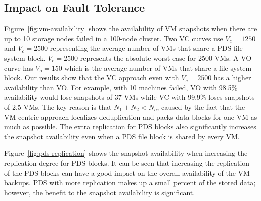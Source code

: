 \subsection{Impact on Fault Tolerance}
Figure~\ref{fig:vm-availability} shows the availability of VM snapshots when 
there are up to 10 storage nodes failed in a 100-node cluster. 
Two VC curves use $V_c=1250$ and $V_c=2500$ representing the average number of VMs that share a PDS file system block. 
$V_c=2500$ represents  the absolute worst case for 2500 VMs. 
A  VO curve has  $V_o=150$ which is  the average number of VMs that share a file system block. 
Our results show that the VC approach even with $V_c=2500$ has a higher availability than VO.
For example, with 10 machines failed, VO with 98.5\% availability would lose snapshots of 37 VMs 
while VC with 99.9\% loses snapshots of 2.5 VMs.
The key reason is that  $N_1 +N_2 < N_o$, caused by the fact that the VM-centric approach localizes deduplication
and packs  data blocks for one VM as much as possible.  The extra replication
for PDS blocks also significantly increases the snapshot availability even when
a PDS file block is shared by every VM.

Figure~\ref{fig:pds-replication}
shows the snapshot availability when increasing the replication degree for PDS blocks. 
It can be seen that increasing the replication of 
the PDS blocks can have a good impact on the overall availability of the VM backups. 
PDS with more replication  makes up a small percent of the
stored data; however, the benefit to the snapshot availability is significant. 

